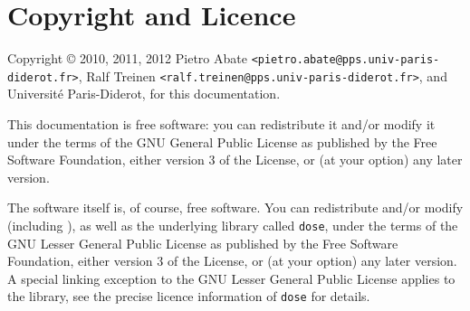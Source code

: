 
\section{Copyright and Licence}
\label{sec:copyright}
Copyright \copyright {} 2010, 2011, 2012
Pietro Abate \verb|<pietro.abate@pps.univ-paris-diderot.fr>|,
Ralf Treinen \verb|<ralf.treinen@pps.univ-paris-diderot.fr>|,
and Université Paris-Diderot, for this documentation.

This documentation is free software: you can redistribute it and/or
modify it under the terms of the GNU General Public License as
published by the Free Software Foundation, either version 3 of the
License, or (at your option) any later version.

The software itself is, of course, free software. You can redistribute
and/or modify \distcheck{} (including \debcheck), as well as the
underlying library called \texttt{dose}, under the terms of the GNU
Lesser General Public License as published by the Free Software
Foundation, either version 3 of the License, or (at your option) any
later version.  A special linking exception to the GNU Lesser General
Public License applies to the library, see the precise licence
information of \texttt{dose} for details.

